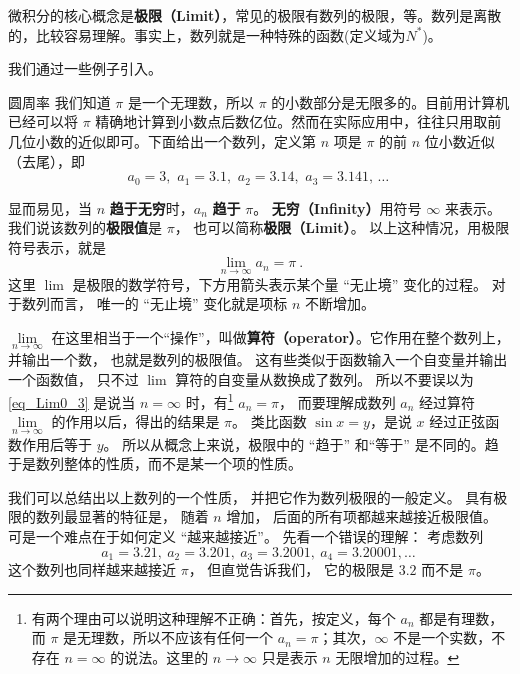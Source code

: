 
微积分的核心概念是\textbf{极限（Limit）}，常见的极限有数列的极限，等。数列是离散的，比较容易理解。事实上，数列就是一种特殊的函数(定义域为$N^{*}$)。

我们通过一些例子引入。

\begin{example}{圆周率}\label{ex_Lim0_1}
我们知道 $\pi$ 是一个无理数，所以 $\pi$ 的小数部分是无限多的。目前用计算机已经可以将 $\pi$ 精确地计算到小数点后数亿位。然而在实际应用中，往往只用取前几位小数的近似即可。下面给出一个数列，定义第 $n$ 项是 $\pi$ 的前 $n$ 位小数近似（去尾），即
\begin{equation}\label{eq_Lim0_1}
a_0 = 3,\,\, a_1 = 3.1,\,\, a_2 = 3.14,\,\, a_3 = 3.141,\,\dots~
\end{equation}

显而易见，当 $n$ \textbf{趋于无穷}时，$a_n$ \textbf{趋于} $\pi$。 \textbf{无穷（Infinity）}用符号 $\infty$ 来表示。 我们说该数列的\textbf{极限值}是 $\pi$， 也可以简称\textbf{极限（Limit）}。 以上这种情况，用极限符号表示，就是
\begin{equation}\label{eq_Lim0_3}
\lim_{n \to \infty } {a_n} = \pi ~.
\end{equation}
这里 $\lim$ 是极限的数学符号，下方用箭头表示某个量 “无止境” 变化的过程。 对于数列而言， 唯一的 “无止境” 变化就是项标 $n$ 不断增加。%
\end{example}

$\lim\limits_{n \to \infty }$ 在这里相当于一个“操作”，叫做\textbf{算符（operator）}。它作用在整个数列上，并输出一个数， 也就是数列的极限值。 这有些类似于函数输入一个自变量并输出一个函数值， 只不过 $\lim$ 算符的自变量从数换成了数列。 所以不要误以为\autoref{eq_Lim0_3} 是说当 $n = \infty$ 时，有\footnote{有两个理由可以说明这种理解不正确：首先，按定义，每个 $a_n$ 都是有理数，而 $\pi$ 是无理数，所以不应该有任何一个 $a_n=\pi$；其次，$\infty$ 不是一个实数，不存在 $n=\infty$ 的说法。这里的 $n\to\infty$ 只是表示 $n$ 无限增加的过程。} $a_n=\pi$， 而要理解成数列 $a_n$ 经过算符 $\lim\limits_{n \to \infty }$ 的作用以后，得出的结果是 $\pi$。 类比函数 $\sin x = y$，是说 $x$ 经过正弦函数作用后等于 $y$。 所以从概念上来说，极限中的 “趋于” 和“等于” 是不同的。趋于是数列整体的性质，而不是某一个项的性质。

我们可以总结出以上数列的一个性质， 并把它作为数列极限的一般定义。 具有极限的数列最显著的特征是， 随着 $n$ 增加， 后面的所有项都越来越接近极限值。 可是一个难点在于如何定义 “越来越接近”。 先看一个错误的理解： 考虑数列
\begin{equation}\label{eq_Lim0_2}
a_1 = 3.21,\ a_2 = 3.201,\ a_3 = 3.2001,\ a_4 = 3.20001, \dots~
\end{equation}
这个数列也同样越来越接近 $\pi$， 但直觉告诉我们， 它的极限是 $3.2$ 而不是 $\pi$。

